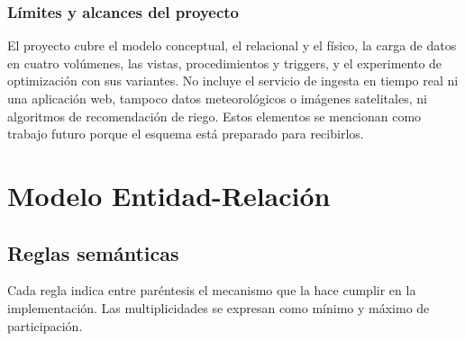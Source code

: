 \documentclass[11pt,letterpaper]{article}
\begin{document}
\subsubsection{Límites y alcances del proyecto}

El proyecto cubre el modelo conceptual, el relacional y el físico, la carga de datos en cuatro volúmenes, las vistas, procedimientos y triggers, y el experimento de optimización con sus variantes. No incluye el servicio de ingesta en tiempo real ni una aplicación web, tampoco datos meteorológicos o imágenes satelitales, ni algoritmos de recomendación de riego. Estos elementos se mencionan como trabajo futuro porque el esquema está preparado para recibirlos.

\section{Modelo Entidad-Relación}

\subsection{Reglas semánticas}

Cada regla indica entre paréntesis el mecanismo que la hace cumplir en la implementación. Las multiplicidades se expresan como mínimo y máximo de participación.
\end{document}
